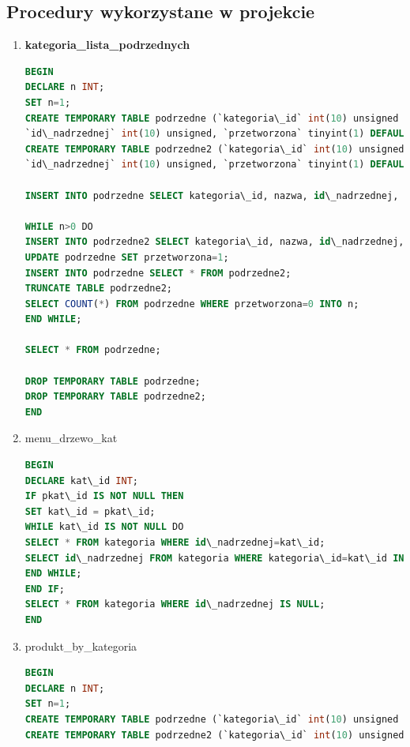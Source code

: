 \subsection{Procedury wykorzystane w projekcie}
\begin{enumerate}
\item \textbf{kategoria\_lista\_podrzednych}
\begin{lstlisting}[language=SQL]
BEGIN
DECLARE n INT;
SET n=1;
CREATE TEMPORARY TABLE podrzedne (`kategoria\_id` int(10) unsigned NOT NULL,`nazwa` varchar(30) COLLATE utf8\_polish\_ci NOT NULL,
`id\_nadrzednej` int(10) unsigned, `przetworzona` tinyint(1) DEFAULT 0);
CREATE TEMPORARY TABLE podrzedne2 (`kategoria\_id` int(10) unsigned NOT NULL,`nazwa` varchar(30) COLLATE utf8\_polish\_ci NOT NULL,
`id\_nadrzednej` int(10) unsigned, `przetworzona` tinyint(1) DEFAULT 0);

INSERT INTO podrzedne SELECT kategoria\_id, nazwa, id\_nadrzednej, 0 FROM kategoria WHERE kategoria\_id=id\_kat;

WHILE n>0 DO
INSERT INTO podrzedne2 SELECT kategoria\_id, nazwa, id\_nadrzednej, 0 FROM kategoria WHERE id\_nadrzednej IN (SELECT kategoria\_id FROM podrzedne WHERE przetworzona=0);
UPDATE podrzedne SET przetworzona=1;
INSERT INTO podrzedne SELECT * FROM podrzedne2;
TRUNCATE TABLE podrzedne2;
SELECT COUNT(*) FROM podrzedne WHERE przetworzona=0 INTO n;
END WHILE;

SELECT * FROM podrzedne;

DROP TEMPORARY TABLE podrzedne;
DROP TEMPORARY TABLE podrzedne2;
END
\end{lstlisting}
\item menu\_drzewo\_kat
\begin{lstlisting}[language=SQL]
BEGIN
DECLARE kat\_id INT;
IF pkat\_id IS NOT NULL THEN
SET kat\_id = pkat\_id;
WHILE kat\_id IS NOT NULL DO
SELECT * FROM kategoria WHERE id\_nadrzednej=kat\_id;
SELECT id\_nadrzednej FROM kategoria WHERE kategoria\_id=kat\_id INTO kat\_id;
END WHILE;
END IF;
SELECT * FROM kategoria WHERE id\_nadrzednej IS NULL;
END
\end{lstlisting}
\item produkt\_by\_kategoria
\begin{lstlisting}[language=SQL]
BEGIN
DECLARE n INT;
SET n=1;
CREATE TEMPORARY TABLE podrzedne (`kategoria\_id` int(10) unsigned NOT NULL, `przetworzona` tinyint(1) DEFAULT 0);
CREATE TEMPORARY TABLE podrzedne2 (`kategoria\_id` int(10) unsigned NOT NULL, `przetworzona` tinyint(1) DEFAULT 0);


\end{lstlisting}
\end{enumerate}

